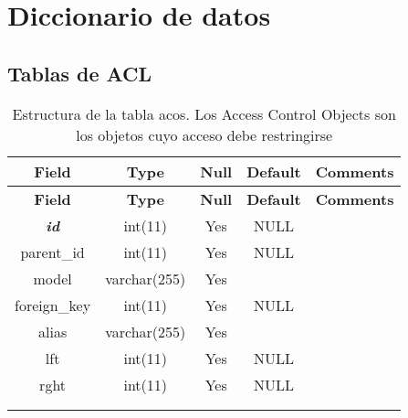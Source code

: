 \section{Diccionario de datos}
\subsection{Tablas de ACL}
% 
%
%
\begin{longtable}{c c c c l}
	\multicolumn{1}{c}{\textbf{Field}} &
	\multicolumn{1}{c}{\textbf{Type}} &
	\multicolumn{1}{c}{\textbf{Null}} &
	\multicolumn{1}{c}{\textbf{Default}} &
	\multicolumn{1}{c}{\textbf{Comments}} \\ \hline \hline
\endfirsthead
	\multicolumn{1}{c}{\textbf{Field}} &
	\multicolumn{1}{c}{\textbf{Type}} &
	\multicolumn{1}{c}{\textbf{Null}} &
	\multicolumn{1}{c}{\textbf{Default}} &
	\multicolumn{1}{c}{\textbf{Comments}} \\ \hline \hline
\endhead \endfoot
	\textbf{\textit{id}} & int(11) & Yes & NULL \\ \hline 
	parent\_id & int(11) & Yes & NULL \\ \hline 
	model & varchar(255) & Yes &  \\ \hline 
	foreign\_key & int(11) & Yes & NULL \\ \hline 
	alias & varchar(255) & Yes &  \\ \hline 
	lft & int(11) & Yes & NULL \\ \hline 
	rght & int(11) & Yes & NULL \\ \\ 
\caption[Estructura de la tabla acos]{Estructura de la tabla acos. Los Access Control Objects son los objetos cuyo acceso debe restringirse \citep{CakePHP_ACL_2008}} \label{tab:acos-structure} \\
\end{longtable}

